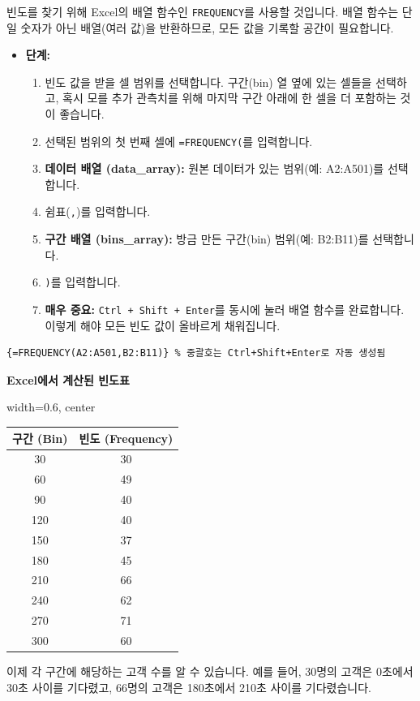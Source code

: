 \documentclass[11pt,a4paper]{book}
\providecommand{\captionof}[2]{\textbf{#2}}
\theoremstyle{definition}
\begin{document}
\begin{tcolorbox}[title={빈도 계산 (Calculating Frequency)}]
빈도를 찾기 위해 Excel의 배열 함수인 \texttt{FREQUENCY}를 사용할 것입니다. 배열 함수는 단일 숫자가 아닌 배열(여러 값)을 반환하므로, 모든 값을 기록할 공간이 필요합니다.

\begin{itemize}
    \item \textbf{단계:}
    \begin{enumerate}
        \item 빈도 값을 받을 셀 범위를 선택합니다. 구간(bin) 열 옆에 있는 셀들을 선택하고, 혹시 모를 추가 관측치를 위해 마지막 구간 아래에 한 셀을 더 포함하는 것이 좋습니다.
        \item 선택된 범위의 첫 번째 셀에 \texttt{=FREQUENCY(}를 입력합니다.
        \item \textbf{데이터 배열 (data\_array):} 원본 데이터가 있는 범위(예: A2:A501)를 선택합니다.
        \item 쉼표(\texttt{,})를 입력합니다.
        \item \textbf{구간 배열 (bins\_array):} 방금 만든 구간(bin) 범위(예: B2:B11)를 선택합니다.
        \item \texttt{)}를 입력합니다.
        \item \textbf{매우 중요:} \texttt{Ctrl + Shift + Enter}를 동시에 눌러 배열 함수를 완료합니다. 이렇게 해야 모든 빈도 값이 올바르게 채워집니다.
    \end{enumerate}
\end{itemize}

\begin{lstlisting}[caption={Excel FREQUENCY 함수 사용 예시}, label={lst:excel_frequency}]
{=FREQUENCY(A2:A501,B2:B11)} % 중괄호는 Ctrl+Shift+Enter로 자동 생성됨
\end{lstlisting}

\begin{center}
\captionof{table}{Excel에서 계산된 빈도표}
\label{tab:excel_frequency_results}
\begin{adjustbox}{width=0.6\textwidth, center}
\begin{tabular}{cc}
\toprule
\textbf{구간 (Bin)} & \textbf{빈도 (Frequency)} \\
\midrule
30 & 30 \\
60 & 49 \\
90 & 40 \\
120 & 40 \\
150 & 37 \\
180 & 45 \\
210 & 66 \\
240 & 62 \\
270 & 71 \\
300 & 60 \\
\bottomrule
\end{tabular}
\end{adjustbox}
\end{center}
이제 각 구간에 해당하는 고객 수를 알 수 있습니다. 예를 들어, 30명의 고객은 0초에서 30초 사이를 기다렸고, 66명의 고객은 180초에서 210초 사이를 기다렸습니다.
\end{tcolorbox}
\end{document}
